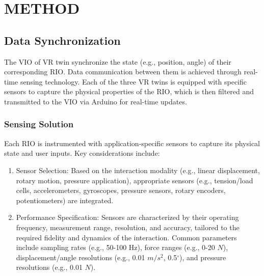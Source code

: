 \section{METHOD}

\subsection{Data Synchronization}
The VIO of VR twin synchronize the state (e.g., position, angle) of their corresponding RIO. Data communication between them is achieved through real-time sensing technology. Each of the three VR twins is equipped with specific sensors to capture the physical properties of the RIO, which is then filtered and transmitted to the VIO via Arduino for real-time updates.

\subsubsection{Sensing Solution}
Each RIO is instrumented with application-specific sensors to capture its physical state and user inputs. Key considerations include:
\begin{enumerate}
  \item Sensor Selection: Based on the interaction modality (e.g., linear displacement, rotary motion, pressure application), appropriate sensors (e.g., tension/load cells, accelerometers, gyroscopes, pressure sensors, rotary encoders, potentiometers) are integrated.

  \item Performance Specification: Sensors are characterized by their operating frequency, measurement range, resolution, and accuracy, tailored to the required fidelity and dynamics of the interaction. Common parameters include sampling rates (e.g., 50-100 Hz), force ranges (e.g., 0-20 $N$), displacement/angle resolutions (e.g., 0.01 $m/s^2$, 0.5$^\circ$), and pressure resolutions (e.g., 0.01 $N$).
\end{enumerate}

